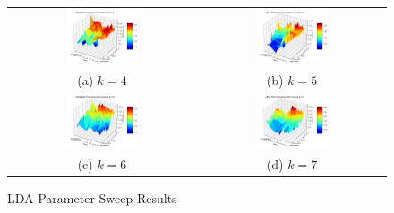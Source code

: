 \begin{figure}[h!]
  \centering
  \begin{tabular}{cc}
    \includegraphics[width=0.40\textwidth]{Figures/Coherence_Surface_k=4} &
    \includegraphics[width=0.40\textwidth]{Figures/Coherence_Surface_k=5} \\
  (a) $k=4$ & (b) $k=5$ \\[6pt]
    \includegraphics[width=0.40\textwidth]{Figures/Coherence_Surface_k=6} &
    \includegraphics[width=0.40\textwidth]{Figures/Coherence_Surface_k=7} \\
  (c) $k=6$ & (d) $k=7$ \\[6pt]
  \end{tabular}
  \caption[LDA Parameter Sweep Results]{LDA Parameter Sweep Results}
  \label{fig:lda_param_sweep}
\end{figure}

